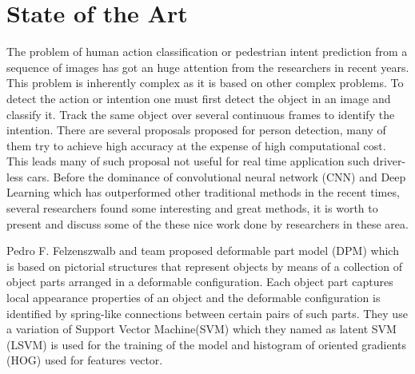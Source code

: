 \chapter{State of the Art}
The problem of human action classification or pedestrian intent prediction from a sequence of images has got an huge attention from the researchers in recent years. 
This problem is inherently complex as it is based on other 
complex problems. To detect the action or intention one must first detect the object in an image and classify it. Track the same object over several continuous frames to identify the intention. There are several proposals proposed for person detection, many of them try to achieve high accuracy at the expense of high computational cost. This leads many of such proposal not useful for real time application such driver-less cars.   
Before the dominance of convolutional neural network (CNN) and Deep Learning which has outperformed other traditional methods in the recent times, several researchers found some interesting and great methods, it is worth to present and discuss some of the these nice work done by researchers in these area. 
\par
Pedro F. Felzenszwalb and team proposed deformable part model (DPM) \cite{felzenszwalb2009object} which is based on pictorial structures that represent objects by means of a collection of object parts arranged in a deformable configuration. Each object part captures local appearance properties of
an object and the deformable configuration is identified  by spring-like connections between certain pairs of such parts. They use a variation of Support Vector Machine(SVM) which they named as latent SVM (LSVM) is used for the training of the model and  histogram of oriented gradients (HOG) used for features vector.



